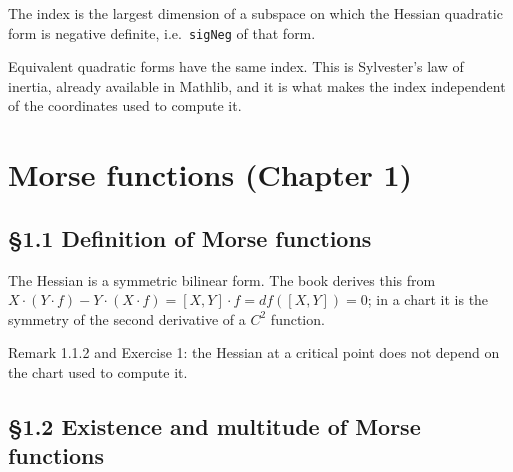 \begin{definition}
  \label{def:index}
  \leanok
  The index is the largest dimension of a subspace on which the Hessian quadratic
  form is negative definite, i.e.\ \texttt{sigNeg} of that form.
\end{definition}

\begin{proposition}
  \label{prop:index_invariant}
  \leanok
  Equivalent quadratic forms have the same index.  This is Sylvester's law of
  inertia, already available in Mathlib, and it is what makes the index
  independent of the coordinates used to compute it.
\end{proposition}

\chapter{Morse functions (Chapter 1)}

\section{\S1.1 Definition of Morse functions}

\begin{proposition}
  \label{prop:hessian_symm}
  \leanok
  The Hessian is a symmetric bilinear form.  The book derives this from
  $X\cdot(Y\cdot f) - Y\cdot(X\cdot f) = [X,Y]\cdot f = df([X,Y]) = 0$; in a chart
  it is the symmetry of the second derivative of a $C^2$ function.
\end{proposition}

\begin{proposition}
  \label{prop:hessian_chart}
  \leanok
  Remark 1.1.2 and Exercise 1: the Hessian at a critical point does not depend on
  the chart used to compute it.
\end{proposition}

\section{\S1.2 Existence and multitude of Morse functions}

